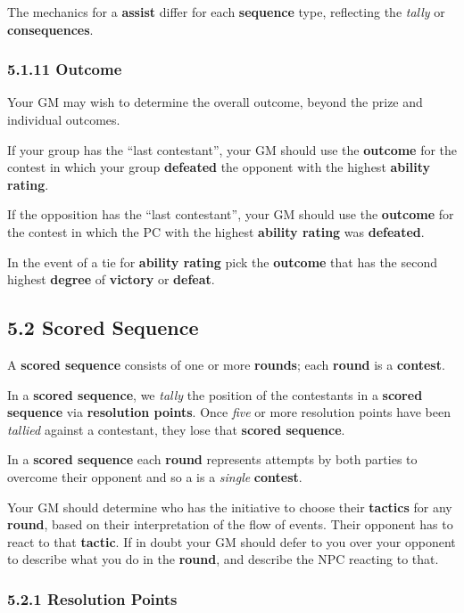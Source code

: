 \documentclass[
  11pt,
]{article}
\begin{document}
The mechanics for a \textbf{assist} differ for each \textbf{sequence}
type, reflecting the \emph{tally} or \textbf{consequences}.

\hypertarget{outcome-1}{%
\subsubsection{5.1.11 Outcome}\label{outcome-1}}

Your GM may wish to determine the overall outcome, beyond the prize and
individual outcomes.

If your group has the ``last contestant'', your GM should use the
\textbf{outcome} for the contest in which your group \textbf{defeated}
the opponent with the highest \textbf{ability rating}.

If the opposition has the ``last contestant'', your GM should use the
\textbf{outcome} for the contest in which the PC with the highest
\textbf{ability rating} was \textbf{defeated}.

In the event of a tie for \textbf{ability rating} pick the
\textbf{outcome} that has the second highest \textbf{degree} of
\textbf{victory} or \textbf{defeat}.

\hypertarget{scored-sequence}{%
\subsection{5.2 Scored Sequence}\label{scored-sequence}}

A \textbf{scored sequence} consists of one or more \textbf{rounds}; each
\textbf{round} is a \textbf{contest}.

In a \textbf{scored sequence}, we \emph{tally} the position of the
contestants in a \textbf{scored sequence} via \textbf{resolution
points}. Once \emph{five} or more resolution points have been
\emph{tallied} against a contestant, they lose that \textbf{scored
sequence}.

In a \textbf{scored sequence} each \textbf{round} represents attempts by
both parties to overcome their opponent and so a is a \emph{single}
\textbf{contest}.

Your GM should determine who has the initiative to choose their
\textbf{tactics} for any \textbf{round}, based on their interpretation
of the flow of events. Their opponent has to react to that
\textbf{tactic}. If in doubt your GM should defer to you over your
opponent to describe what you do in the \textbf{round}, and describe the
NPC reacting to that.

\hypertarget{resolution-points}{%
\subsubsection{5.2.1 Resolution Points}\label{resolution-points}}
\end{document}
